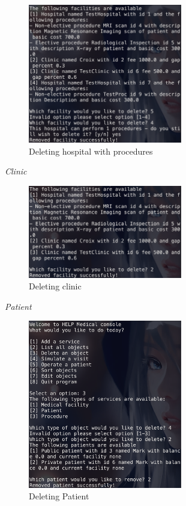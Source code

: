 \documentclass{article}
\begin{document}
	\begin{figure}
		\begin{center}
			\includegraphics[width=0.6\textwidth]{figures/Deleting/Deleting_Hospital_02.png}
		\end{center}
		\caption{Deleting hospital with procedures}\label{fig:deleting_hospital_02}
	\end{figure}
	
	\textit{Clinic}
	\begin{figure}
		\begin{center}
			\includegraphics[width=0.6\textwidth]{figures/Deleting/Deleting_Clinic_02.png}
		\end{center}
		\caption{Deleting clinic}\label{fig:deleting_clinic_02}
	\end{figure}
	
	\textit{Patient}
	\begin{figure}
		\begin{center}
			\includegraphics[width=0.6\textwidth]{figures/Deleting/Deleting_Patient_01.png}
		\end{center}
		\caption{Deleting Patient}\label{fig:deleting_patient_01}
	\end{figure}
\end{document}
